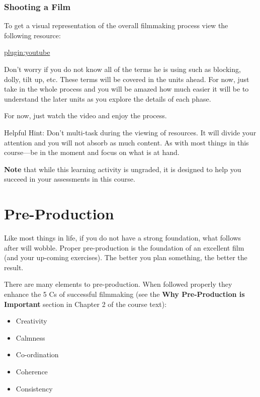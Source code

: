 \documentclass[
]{book}
\providecommand{\tightlist}{%
  \setlength{\itemsep}{0pt}\setlength{\parskip}{0pt}}
\begin{document}
\begin{reflect}
\hypertarget{shooting-a-film}{%
\subsubsection*{Shooting a Film}\label{shooting-a-film}}

To get a visual representation of the overall filmmaking process view the following resource:

\href{https://www.youtube.com/watch?v=8NCLf9rF6IQ}{plugin:youtube}

Don't worry if you do not know all of the terms he is using such as blocking, dolly, tilt up, etc. These terms will be covered in the units ahead. For now, just take in the whole process and you will be amazed how much easier it will be to understand the later units as you explore the details of each phase.

For now, just watch the video and enjoy the process.

Helpful Hint: Don't multi-task during the viewing of resources. It will divide your attention and you will not absorb as much content. As with most things in this course---be in the moment and focus on what is at hand.
\end{reflect}

\begin{caution}
\textbf{Note} that while this learning activity is ungraded, it is designed to help you succeed in your assessments in this course.
\end{caution}

\hypertarget{pre-production}{%
\section*{Pre-Production}\label{pre-production}}

Like most things in life, if you do not have a strong foundation, what follows after will wobble. Proper pre-production is the foundation of an excellent film (and your up-coming exercises). The better you plan something, the better the result.

There are many elements to pre-production. When followed properly they enhance the 5 Cs of successful filmmaking (see the \textbf{Why Pre-Production is Important} section in Chapter 2 of the course text):

\begin{itemize}
\tightlist
\item
  Creativity\\
\item
  Calmness\\
\item
  Co-ordination\\
\item
  Coherence\\
\item
  Consistency
\end{itemize}
\end{document}
